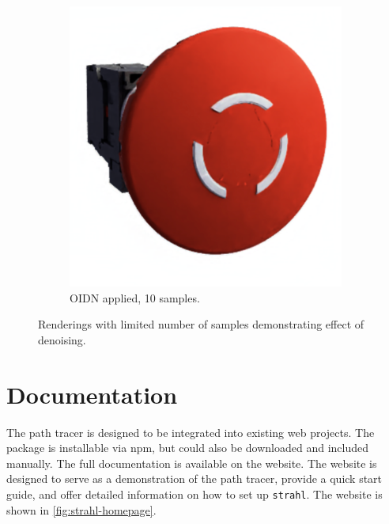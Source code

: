 \begin{figure}[H]
\begin{subfigure}[t]{0.4\textwidth}
        \includegraphics[width=\textwidth]{resources/denoise-oidn-10-samples.png}
        \caption{\gls{OIDN} applied, 10 samples.}
        \label{fig:denoise-oidn-10-samples}
    \end{subfigure}
    \hspace*{2cm}
    \caption{Renderings with limited number of samples demonstrating effect of denoising.}
    \label{fig:denoise-samples}
\end{figure}

\section{Documentation}

The path tracer is designed to be integrated into existing web projects. The package is installable via \gls{npm}, but could also be downloaded and included manually. The full documentation is available on the website. The website is designed to serve as a demonstration of the path tracer, provide a quick start guide, and offer detailed information on how to set up \texttt{strahl}. The website is shown in \autoref{fig:strahl-homepage}.

